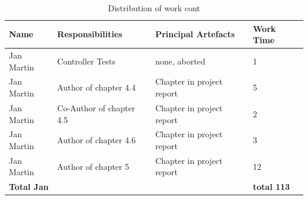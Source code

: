     \begin{table}[!h]
  \caption{Distribution of work cont}
  \centering
  \begin{tabular}{p{2cm}||p{4.2cm}|p{4cm}|l|}
  Name & Responsibilities & Principal Artefacts & Work Time\\
    \hline
  	\hline  
    Jan Martin & Controller Tests & none, aborted & 1 \\ 
    \hline  
    Jan Martin & Author of chapter 4.4 & Chapter in project report & 5 \\ 
    \hline
    Jan Martin & Co-Author of chapter 4.5 & Chapter in project report & 2 \\
    \hline 
    Jan Martin & Author of chapter 4.6 & Chapter in project report & 3 \\ 
    \hline
    Jan Martin & Author of chapter 5 & Chapter in project report & 12 \\ 
    \hline
    \hline 
    \textbf{Total \newline Jan} & & & \textbf{total 113}   \\
    \hline
    \hline
  \end{tabular}
\end{table}
\newpage
